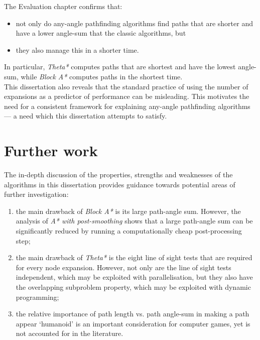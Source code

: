 \documentclass[12pt,notitlepage]{report}
\begin{document}
\noindent
The Evaluation chapter confirms that:
\begin{itemize} 
\item not only do any-angle pathfinding algorithms find paths that are shorter and have a lower angle-sum that the classic algorithms, but 
\item they also manage this in a shorter time. 
\end{itemize}

\noindent
In particular, {\em Theta*} computes paths that are shortest and have the lowest angle-sum, while {\em Block A*} computes paths in the shortest time.\\

\noindent
This dissertation also reveals that the standard practice of using the number of expansions as a predictor of performance can be misleading. This motivates the need for a consistent framework for explaining any-angle pathfinding algorithms --- a need which this dissertation attempts to satisfy.

\section{Further work}
The in-depth discussion of the properties, strengths and weaknesses of the algorithms in this dissertation provides guidance towards potential areas of further investigation:
\begin{enumerate}
\item the main drawback of {\em Block A*} is its large path-angle sum. However, the analysis of {\em A* with post-smoothing} shows that a large path-angle sum can be significantly reduced by running a computationally cheap post-processing step;
\item the main drawback of {\em Theta*} is the eight line of sight tests that are required for every node expansion. However, not only are the line of sight tests independent, which may be exploited with parallelisation, but they also have the overlapping subproblem property, which may be exploited with dynamic programming;
\item the relative importance of path length vs. path angle-sum in making a path appear `humanoid' is an important consideration for computer games, yet is not accounted for in the literature.
\end{enumerate} 

{}



\end{document}
